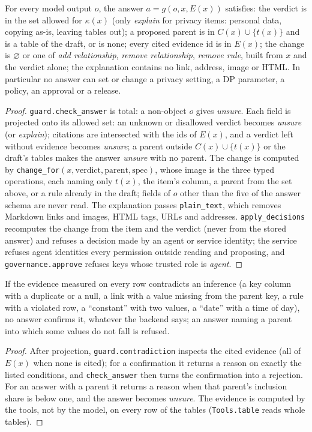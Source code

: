 \begin{proposition}[Containment]\label{prop:agguard}
For every model output $o$, the answer $a=g(o,x,E(x))$ satisfies: the verdict is in the set allowed for
$\kappa(x)$ (only \emph{explain} for privacy items: personal data, copying as-is, leaving tables out); a proposed
parent is in $C(x)\cup\{t(x)\}$ and is a table of the draft, or is none; every cited evidence id is in $E(x)$; the
change is $\varnothing$ or one of \emph{add relationship}, \emph{remove relationship}, \emph{remove rule}, built
from $x$ and the verdict alone; the explanation contains no link, address, image or HTML. In particular no answer
can set or change a privacy setting, a DP parameter, a policy, an approval or a release.
\end{proposition}
\begin{proof}
\texttt{guard.check\_answer} is total: a non-object $o$ gives \emph{unsure}. Each field is projected onto its allowed
set: an unknown or disallowed verdict becomes \emph{unsure} (or \emph{explain}); citations are intersected with the
ids of $E(x)$, and a verdict left without evidence becomes \emph{unsure}; a parent outside
$C(x)\cup\{t(x)\}$ or the draft's tables makes the answer \emph{unsure} with no parent. The change is computed by
\texttt{change\_for}$(x,\text{verdict},\text{parent},\text{spec})$, whose image is the three typed operations, each
naming only $t(x)$, the item's column, a parent from the set above, or a rule already in the draft; fields of $o$
other than the five of the answer schema are never read. The explanation passes \texttt{plain\_text}, which removes
Markdown links and images, HTML tags, URLs and addresses. \texttt{apply\_decisions} recomputes the change from the
item and the verdict (never from the stored answer) and refuses a decision made by an agent or service identity; the
service refuses agent identities every permission outside reading and proposing, and \texttt{governance.approve}
refuses keys whose trusted role is \emph{agent}.
\end{proof}

\begin{proposition}\label{prop:agevidence}
If the evidence measured on every row contradicts an inference (a key column with a duplicate or a null, a link
with a value missing from the parent key, a rule with a violated row, a ``constant'' with two values, a ``date'' with
a time of day), no answer confirms it, whatever the backend says; an answer naming a parent into which some values
do not fall is refused.
\end{proposition}
\begin{proof}
After projection, \texttt{guard.contradiction} inspects the cited evidence (all of $E(x)$ when none is cited); for a
confirmation it returns a reason on exactly the listed conditions, and \texttt{check\_answer} then turns the
confirmation into a rejection. For an answer with a parent it returns a reason when that parent's inclusion share is
below one, and the answer becomes \emph{unsure}. The evidence is computed by the tools, not by the model, on every
row of the tables (\texttt{Tools.table} reads whole tables).
\end{proof}

